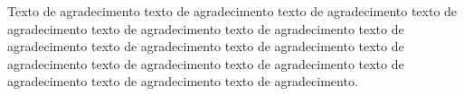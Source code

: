 Texto de agradecimento texto de agradecimento texto de agradecimento texto de agradecimento texto de agradecimento texto de agradecimento texto de agradecimento texto de agradecimento texto de agradecimento texto de agradecimento texto de agradecimento texto de agradecimento texto de agradecimento texto de agradecimento texto de agradecimento.


